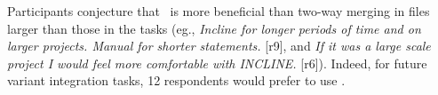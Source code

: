 Participants conjecture that \tooln~is more beneficial than two-way merging in files larger than those in the tasks (eg., \textit{\bc Incline for longer periods of time and on larger projects. Manual for shorter statements.\ec} [r9], and \textit{\bc If it was a large scale project I would feel more comfortable with INCLINE.\ec} [r6]). Indeed, for future variant integration tasks, 12 respondents would prefer to use \tooln.





